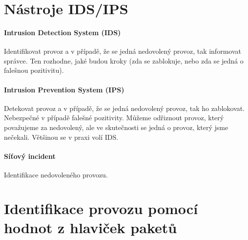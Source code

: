 
\section{Nástroje IDS/IPS}

\paragraph*{Intrusion Detection System (IDS)} Identifikovat provoz a v případě, že se jedná nedovolený provoz, tak informovat správce. Ten rozhodne, jaké budou kroky (zda se zablokuje, nebo zda se jedná o falešnou pozitivitu).

\paragraph*{Intrusion Prevention System (IPS)} Detekovat provoz a v případě, že se jedná nedovolený provoz, tak ho zablokovat. Nebezpečné v případě falešné pozitivity. Můžeme odřiznout provoz, který považujeme za nedovolený, ale ve skutečnosti se jedná o provoz, který jsme nečekali. Většinou se v praxi volí IDS.

\paragraph*{Síťový incident} Identifikace nedovoleného provozu.


\section{Identifikace provozu pomocí hodnot z hlaviček paketů}

